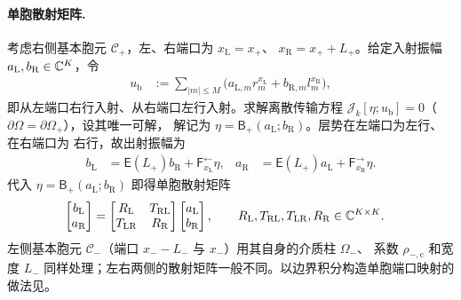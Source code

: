 \paragraph{单胞散射矩阵.}
考虑右侧基本胞元 $\mathcal C_+$，左、右端口为 $x_{\mathrm L}=x_+$、
$x_{\mathrm R}=x_++L_+$。给定入射振幅 $a_{\mathrm L},b_{\mathrm R}\in\mathbb{C}^K$，令
\begin{align}
  u_{\mathrm b}
  &:=\sum_{|m|\leq M}\bigl(a_{\mathrm L,m}r_m^{x_{\mathrm L}}
    +b_{\mathrm R,m}l_m^{x_{\mathrm R}}\bigr),
  \label{eq:cell-incident}
\end{align}
即从左端口右行入射、从右端口左行入射。求解离散传输方程
$\mathscr J_k[\eta;u_{\mathrm b}]=0$（$\partial\Omega=\partial\Omega_+$），设其唯一可解，
解记为 $\eta=\mathsf B_+(a_{\mathrm L};b_{\mathrm R})$。层势在左端口为左行、在右端口为
右行，故出射振幅为
\begin{align}
  b_{\mathrm L}
  &=\mathsf E(L_+)b_{\mathrm R}+\mathsf F^{\leftarrow}_{x_{\mathrm L}}\eta,
  &a_{\mathrm R}
  &=\mathsf E(L_+)a_{\mathrm L}+\mathsf F^{\rightarrow}_{x_{\mathrm R}}\eta.
  \label{eq:cell-outgoing}
\end{align}
代入 $\eta=\mathsf B_+(a_{\mathrm L};b_{\mathrm R})$ 即得单胞散射矩阵
\begin{align}
  \begin{bmatrix}b_{\mathrm L}\\ a_{\mathrm R}\end{bmatrix}
  &=
  \begin{bmatrix}R_{\mathrm L}&T_{\mathrm{RL}}\\ T_{\mathrm{LR}}&R_{\mathrm R}\end{bmatrix}
  \begin{bmatrix}a_{\mathrm L}\\ b_{\mathrm R}\end{bmatrix},
  \qquad R_{\mathrm L},T_{\mathrm{RL}},T_{\mathrm{LR}},R_{\mathrm R}\in\mathbb{C}^{K\times K}.
  \label{eq:one-cell-scattering}
\end{align}
左侧基本胞元 $\mathcal C_-$（端口 $x_--L_-$ 与 $x_-$）用其自身的介质柱 $\Omega_-$、
系数 $\rho_{-,\mathrm c}$ 和宽度 $L_-$ 同样处理；左右两侧的散射矩阵一般不同。以边界积分构造单胞端口映射的做法见\cite{YuanLuAntoine2008,HuangLuLi2007}。


